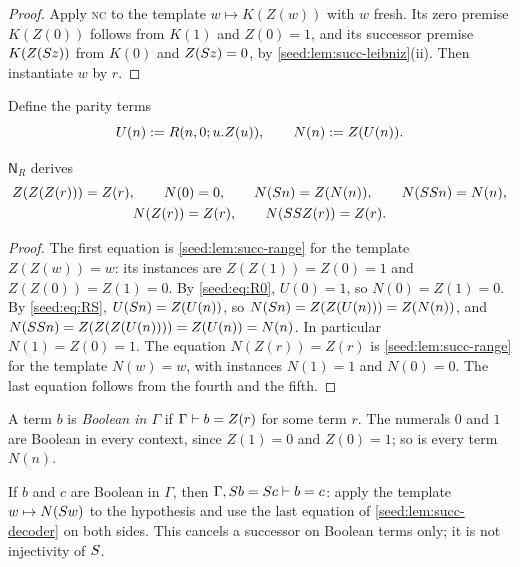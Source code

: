 \begin{proof}
Apply \textsc{nc} to the template $w\mapsto K(Z(w))$ with $w$ fresh. Its zero
premise $K(Z(0))$ follows from $K(1)$ and $Z(0)=1$, and its successor premise
$K(Z(S z))$ from $K(0)$ and $Z(S z)=0$, by
\cref{seed:lem:succ-leibniz}(ii). Then instantiate $w$ by $r$.
\end{proof}

Define the parity terms
\[
 U(n)\mathrel{:=} R(n,0;u.Z(u)),\qquad N(n)\mathrel{:=} Z(U(n)).
\]

\begin{lemma}\label{seed:lem:succ-decoder}
$\mathsf{N}_R$ derives
\begin{gather*}
 Z(Z(Z(r)))=Z(r),\qquad N(0)=0,\qquad N(S n)=Z(N(n)),\qquad
 N(SS n)=N(n),\\
 N(Z(r))=Z(r),\qquad N(SS Z(r))=Z(r).
\end{gather*}
\end{lemma}

\begin{proof}
The first equation is \cref{seed:lem:succ-range} for the template
$Z(Z(w))=w$: its instances are $Z(Z(1))=Z(0)=1$ and $Z(Z(0))=Z(1)=0$.
By \eqref{seed:eq:R0}, $U(0)=1$, so $N(0)=Z(1)=0$. By \eqref{seed:eq:RS},
$U(S n)=Z(U(n))$, so $N(S n)=Z(Z(U(n)))=Z(N(n))$, and
$N(SS n)=Z(Z(Z(U(n))))=Z(U(n))=N(n)$. In particular $N(1)=Z(0)=1$.
The equation $N(Z(r))=Z(r)$ is \cref{seed:lem:succ-range} for the template
$N(w)=w$, with instances $N(1)=1$ and $N(0)=0$. The last equation follows
from the fourth and the fifth.
\end{proof}

\begin{definition}\label{seed:def:boolean}
A term $b$ is \emph{Boolean in $\Gamma$} if $\Gamma\vdash b=Z(r)$ for some
term $r$. The numerals $0$ and $1$ are Boolean in every context, since
$Z(1)=0$ and $Z(0)=1$; so is every term $N(n)$.
\end{definition}

If $b$ and $c$ are Boolean in $\Gamma$, then
$\Gamma,S b=S c\vdash b=c$: apply the template $w\mapsto N(S w)$ to
the hypothesis and use the last equation of \cref{seed:lem:succ-decoder} on
both sides. This cancels a successor on Boolean terms only; it is not
injectivity of $S$.

